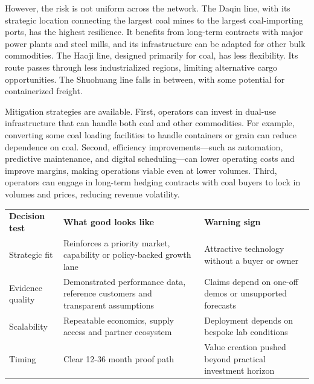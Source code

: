 \documentclass[10pt,a4paper]{article}
\begin{document}
{\small However, the risk is not uniform across the network. The Daqin line, with its strategic location connecting the largest coal mines to the largest coal-importing ports, has the highest resilience. It benefits from long-term contracts with major power plants and steel mills, and its infrastructure can be adapted for other bulk commodities. The Haoji line, designed primarily for coal, has less flexibility. Its route passes through less industrialized regions, limiting alternative cargo opportunities. The Shuohuang line falls in between, with some potential for containerized freight.}

{\small Mitigation strategies are available. First, operators can invest in dual-use infrastructure that can handle both coal and other commodities. For example, converting some coal loading facilities to handle containers or grain can reduce dependence on coal. Second, efficiency improvements—such as automation, predictive maintenance, and digital scheduling—can lower operating costs and improve margins, making operations viable even at lower volumes. Third, operators can engage in long-term hedging contracts with coal buyers to lock in volumes and prices, reducing revenue volatility.}
\vspace{3pt}\noindent{}\vspace{4pt}

\vspace{4pt}{\textcolor{BOBlue}{\scriptsize\bfseries DECISION FILTER FOR MANAGEMENT ACTION}}\par
\begin{tabularx}{\linewidth}{p{34mm}YY}
\textcolor{BOBlue}{\bfseries Decision test} & \textcolor{BOBlue}{\bfseries What good looks like} & \textcolor{BOBlue}{\bfseries Warning sign} \\
Strategic fit & Reinforces a priority market, capability or policy-backed growth lane & Attractive technology without a buyer or owner \\
Evidence quality & Demonstrated performance data, reference customers and transparent assumptions & Claims depend on one-off demos or unsupported forecasts \\
Scalability & Repeatable economics, supply access and partner ecosystem & Deployment depends on bespoke lab conditions \\
Timing & Clear 12-36 month proof path & Value creation pushed beyond practical investment horizon \\
\end{tabularx}
\end{document}
